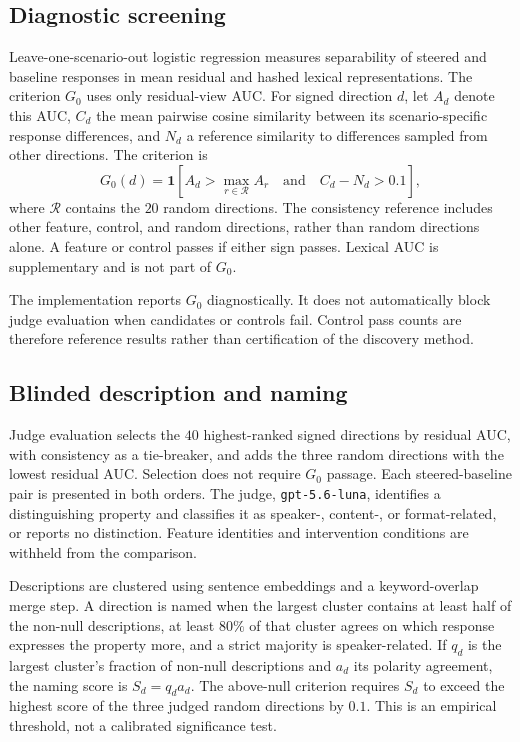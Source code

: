 \documentclass[11pt]{article}
\begin{document}
\subsection{Diagnostic screening}
Leave-one-scenario-out logistic regression measures separability of steered and
baseline responses in mean residual and hashed lexical representations. The
criterion $G_0$ uses only residual-view AUC. For signed direction $d$, let $A_d$
denote this AUC, $C_d$ the mean pairwise cosine similarity between its
scenario-specific response differences, and $N_d$ a reference similarity to
differences sampled from other directions. The criterion is
\[
G_0(d)=\mathbf{1}\!\left[A_d>\max_{r\in\mathcal R}A_r
\quad\text{and}\quad C_d-N_d>0.1\right],
\]
where $\mathcal R$ contains the $20$ random directions. The consistency reference
includes other feature, control, and random directions, rather than random
directions alone. A feature or control passes if either sign passes. Lexical AUC
is supplementary and is not part of $G_0$.

The implementation reports $G_0$ diagnostically. It does not automatically block
judge evaluation when candidates or controls fail. Control pass counts are
therefore reference results rather than certification of the discovery method.

\subsection{Blinded description and naming}
Judge evaluation selects the $40$ highest-ranked signed directions by residual
AUC, with consistency as a tie-breaker, and adds the three random directions with
the lowest residual AUC. Selection does not require $G_0$ passage. Each
steered-baseline pair is presented in both orders. The judge,
\texttt{gpt-5.6-luna}, identifies a distinguishing property and classifies it as
speaker-, content-, or format-related, or reports no distinction. Feature
identities and intervention conditions are withheld from the comparison.

Descriptions are clustered using sentence embeddings and a keyword-overlap merge
step. A direction is named when the largest cluster contains at least half of the
non-null descriptions, at least $80\%$ of that cluster agrees on which response
expresses the property more, and a strict majority is speaker-related. If $q_d$
is the largest cluster's fraction of non-null descriptions and $a_d$ its polarity
agreement, the naming score is $S_d=q_da_d$. The above-null criterion requires
$S_d$ to exceed the highest score of the three judged random directions by $0.1$.
This is an empirical threshold, not a calibrated significance test.
\end{document}
